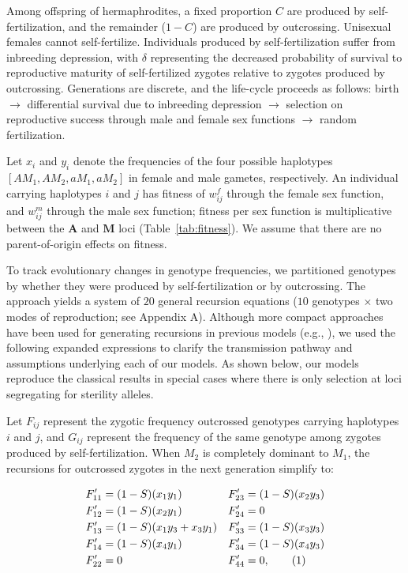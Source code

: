 \documentclass{article}
\newcommand\numberthis{\addtocounter{equation}{1}\tag{\theequation}}
\begin{document}
Among offspring of hermaphrodites, a fixed proportion $C$ are produced by self-fertilization, and the remainder ($1 - C$) are produced by outcrossing. Unisexual females cannot self-fertilize. Individuals produced by self-fertilization suffer from inbreeding depression, with $\delta$ representing the decreased probability of survival to reproductive maturity of self-fertilized zygotes relative to zygotes produced by outcrossing. Generations are discrete, and the life-cycle proceeds as follows: birth $\rightarrow$ differential survival due to inbreeding depression $\rightarrow$ selection on reproductive success through male and female sex functions $\rightarrow$ random fertilization.

Let $x_i$ and $y_i$ denote the frequencies of the four possible haplotypes $[AM_1,AM_2,aM_1,aM_2]$ in female and male gametes, respectively. An individual carrying haplotypes $i$ and $j$ has fitness of $w^f_{ij}$ through the female sex function, and $w^m_{ij}$ through the male sex function; fitness per sex function is multiplicative between the $\mathbf{A}$ and $\mathbf{M}$ loci (Table~\ref{tab:fitness}). We assume that there are no parent-of-origin effects on fitness.

To track evolutionary changes in genotype frequencies, we partitioned genotypes by whether they were produced by self-fertilization or by outcrossing. The approach yields a system of $20$ general recursion equations ($10$ genotypes $\times$ two modes of reproduction; see Appendix A). Although more compact approaches have been used for generating recursions in previous models (e.g., \citealt{Charlesworth1978a, Charlesworth2010}), we used the following expanded expressions to clarify the transmission pathway and assumptions underlying each of our models. As shown below, our models reproduce the classical results in special cases where there is only selection at loci segregating for sterility alleles.

Let $F_{ij}$ represent the zygotic frequency outcrossed genotypes carrying haplotypes $i$ and $j$, and $G_{ij}$ represent the frequency of the same genotype among zygotes produced by self-fertilization. When $M_2$ is completely dominant to $M_1$, the recursions for outcrossed zygotes in the next generation simplify to:
\begin{linenomath}\begin{align*} \label{eq:FprGyn}
    F'_{11} &= (1 - S) (x_1 y_1)            & F'_{23} &= (1 - S) (x_2 y_3)  \\
    F'_{12} &= (1 - S) (x_2 y_1)            & F'_{24} &= 0 \\
    F'_{13} &= (1 - S) (x_1 y_3 + x_3 y_1)  & F'_{33} &= (1 - S) (x_3 y_3)  \\
    F'_{14} &= (1 - S) (x_4 y_1)            & F'_{34} &= (1 - S) (x_4 y_3)  \\
    F'_{22} &= 0                            & F'_{44} &= 0, \numberthis
\end{align*}\end{linenomath}
\end{document}
